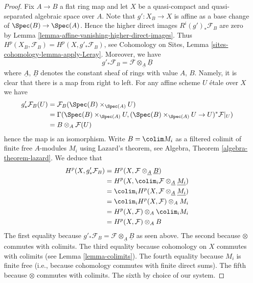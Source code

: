 \begin{proof}
\medskip\noindent
Fix $A \to B$ a flat ring map and let $X$ be a quasi-compact and
quasi-separated algebraic space over $A$. Note that $g' : X_B \to X$
is affine as a base change of $\Spec(B) \to \Spec(A)$. Hence
the higher direct images $R^i(g')_*\mathcal{F}_B$ are zero by
Lemma \ref{lemma-affine-vanishing-higher-direct-images}.
Thus $H^p(X_B, \mathcal{F}_B) = H^p(X, g'_*\mathcal{F}_B)$, see
Cohomology on Sites, Lemma \ref{sites-cohomology-lemma-apply-Leray}.
Moreover, we have
$$
g'_*\mathcal{F}_B = \mathcal{F} \otimes_{\underline{A}} \underline{B}
$$
where $\underline{A}$, $\underline{B}$ denotes the constant sheaf of
rings with value $A$, $B$. Namely, it is clear that there is a map
from right to left. For any affine scheme $U$ \'etale over $X$ we have
\begin{align*}
g'_*\mathcal{F}_B(U) & = \mathcal{F}_B(\Spec(B) \times_{\Spec(A)} U) \\
& =
\Gamma(\Spec(B) \times_{\Spec(A)} U,
(\Spec(B) \times_{\Spec(A)} U \to U)^*\mathcal{F}|_U) \\
& =
B \otimes_A \mathcal{F}(U)
\end{align*}
hence the map is an isomorphism. Write $B = \colim M_i$ as a filtered
colimit of finite free $A$-modules $M_i$ using Lazard's theorem, see
Algebra, Theorem \ref{algebra-theorem-lazard}.
We deduce that
\begin{align*}
H^p(X, g'_*\mathcal{F}_B) &
= H^p(X, \mathcal{F} \otimes_{\underline{A}} \underline{B}) \\
& = H^p(X, \colim_i \mathcal{F} \otimes_{\underline{A}} \underline{M_i}) \\
& = \colim_i H^p(X, \mathcal{F} \otimes_{\underline{A}} \underline{M_i}) \\
& = \colim_i H^p(X, \mathcal{F}) \otimes_A M_i \\
& = H^p(X, \mathcal{F}) \otimes_A \colim_i M_i \\
& = H^p(X, \mathcal{F}) \otimes_A B
\end{align*}
The first equality because
$g'_*\mathcal{F}_B = \mathcal{F} \otimes_{\underline{A}} \underline{B}$
as seen above.
The second because $\otimes$ commutes with colimits.
The third equality because cohomology on $X$ commutes with
colimits (see
Lemma \ref{lemma-colimits}).
The fourth equality because $M_i$ is finite free (i.e., because cohomology
commutes with finite direct sums).
The fifth because $\otimes$ commutes with colimits.
The sixth by choice of our system.
\end{proof}


